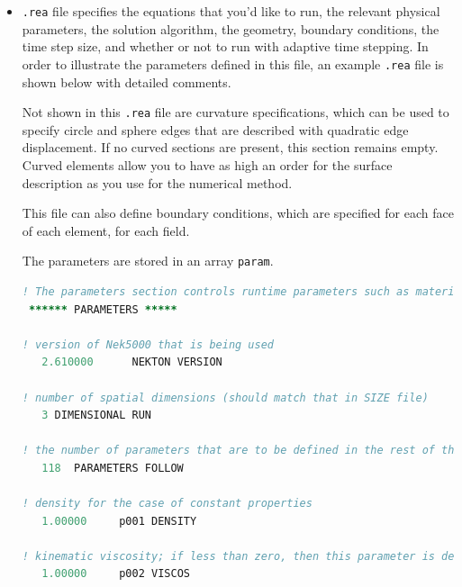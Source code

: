 \documentclass[10pt]{article}
\numberwithin{equation}{section} %
\begin{document}
\begin{itemize}
\begin{lstlisting}[language=Fortran]
c automatically added by makenek
      integer lelcmt
      parameter(lelcmt = 1  ) ! # of cmt elements
c IFCMT=FALSE  then lelcmt=1
\end{lstlisting}

\item {\tt .rea} file specifies the equations that you'd like to run, the relevant physical parameters, the solution algorithm, the geometry, boundary conditions, the time step size, and whether or not to run with adaptive time stepping. In order to illustrate the parameters defined in this file, an example {\tt .rea} file is shown below with detailed comments. 

Not shown in this {\tt .rea} file are curvature specifications, which can be used to specify circle and sphere edges that are described with quadratic edge displacement. If no curved sections are present, this section remains empty. Curved elements allow you to have as high an order for the surface description as you use for the numerical method. 

This file can also define boundary conditions, which are specified for each face of each element, for each field. 

The parameters are stored in an array {\tt param}. 

\begin{lstlisting}[language=Fortran]
! The parameters section controls runtime parameters such as material properties, number of time steps, the order of the time integration, frequency of output, iteration tolerances, flow rate, etc. This section also contains several free parameters that the user can use as handles to be passed into the user defined routines in the user file. 
 ****** PARAMETERS *****
 
! version of Nek5000 that is being used
   2.610000      NEKTON VERSION
 
! number of spatial dimensions (should match that in SIZE file)
   3 DIMENSIONAL RUN
 
! the number of parameters that are to be defined in the rest of this file. In order to read these correctly, you cannot have any blank lines, since this determines how many lines to read. For commenting purposes, this is ignored here.
   118  PARAMETERS FOLLOW
   
! density for the case of constant properties
   1.00000     p001 DENSITY

! kinematic viscosity; if less than zero, then this parameter is defined to represent the Reynolds number, and the kinematic viscosity is set to -1 divided by the Reynolds number (for the nondimensional form of the momentum equation).
   1.00000     p002 VISCOS


\end{lstlisting}
\end{itemize}
\end{document}
